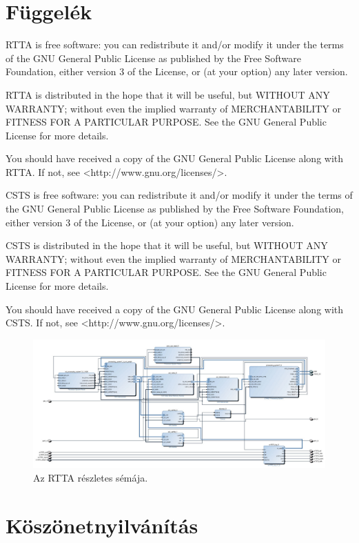 \documentclass[a4paper,12pt]{report}
\begin{document}

\chapter*{Függelék}

\noindent
RTTA is free software: you can redistribute it and/or modify
it under the terms of the GNU General Public License as published by
the Free Software Foundation, either version 3 of the License, or
(at your option) any later version.

\noindent
RTTA is distributed in the hope that it will be useful,
but WITHOUT ANY WARRANTY; without even the implied warranty of
MERCHANTABILITY or FITNESS FOR A PARTICULAR PURPOSE.  See the
GNU General Public License for more details.

\noindent
You should have received a copy of the GNU General Public License
along with RTTA. If not, see <http://www.gnu.org/licenses/>.

\noindent
CSTS is free software: you can redistribute it and/or modify
it under the terms of the GNU General Public License as published by
the Free Software Foundation, either version 3 of the License, or
(at your option) any later version.

\noindent
CSTS is distributed in the hope that it will be useful,
but WITHOUT ANY WARRANTY; without even the implied warranty of
MERCHANTABILITY or FITNESS FOR A PARTICULAR PURPOSE.  See the
GNU General Public License for more details.

\noindent
You should have received a copy of the GNU General Public License
along with CSTS. If not, see <http://www.gnu.org/licenses/>.


\begin{figure}
    \centering
    \includegraphics[width=10in]{img/base_design_1}
    \caption{Az RTTA részletes sémája.}
    \label{detailedscheme}
\end{figure}

\chapter*{Köszönetnyilvánítás}
\end{document}

